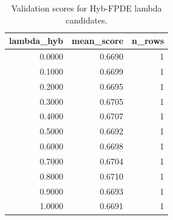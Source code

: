 \begin{table}[t]
\caption{Validation scores for Hyb-FPDE lambda candidates.}
\label{tab:lambda_distribution_computed}
\centering
\begin{tabular}{rrr}
\toprule
lambda\_hyb & mean\_score & n\_rows \\
\midrule
0.0000 & 0.6690 & 1 \\
0.1000 & 0.6699 & 1 \\
0.2000 & 0.6695 & 1 \\
0.3000 & 0.6705 & 1 \\
0.4000 & 0.6707 & 1 \\
0.5000 & 0.6692 & 1 \\
0.6000 & 0.6698 & 1 \\
0.7000 & 0.6704 & 1 \\
0.8000 & 0.6710 & 1 \\
0.9000 & 0.6693 & 1 \\
1.0000 & 0.6691 & 1 \\
\bottomrule
\end{tabular}

\end{table}
